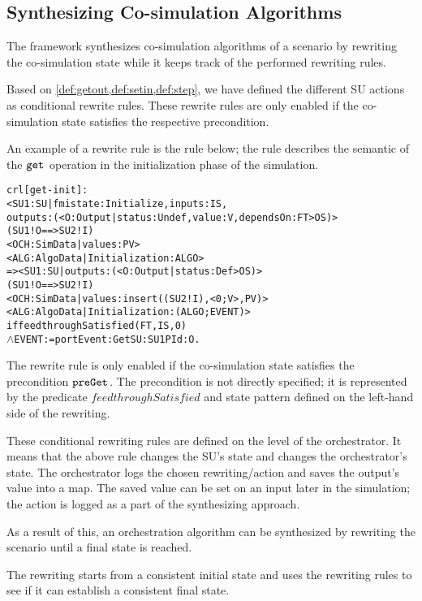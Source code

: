 \subsection{Synthesizing Co-simulation Algorithms}
The framework synthesizes co-simulation algorithms of a scenario by rewriting the co-simulation state while it keeps track of the performed rewriting rules.

Based on \cref{def:getout,def:setin,def:step}, we have defined the different SU actions as conditional rewrite rules.
These rewrite rules are only enabled if the co-simulation state satisfies the respective precondition.

An example of a rewrite rule is the rule below; the rule describes the semantic of the $\mathtt{get}_{}$ operation in the initialization phase of the simulation.

\begin{alltt}
  \small
  crl [get-init] :
  < SU1 : SU | fmistate : Initialize, inputs : IS, 
    outputs : (< O : Output | status : Undef, value : V, dependsOn : FT > OS) > 
  (SU1 ! O ==> SU2 ! I)
  < OCH : SimData | values : PV > 
  < ALG : AlgoData | Initialization : ALGO >
  => < SU1 : SU | outputs : (< O : Output | status : Def > OS) > 
    (SU1 ! O ==> SU2 ! I)
    < OCH : SimData | values : insert((SU2 ! I), < 0 ; V >, PV) >  
    < ALG : AlgoData | Initialization : (ALGO ; EVENT) >
if feedthroughSatisfied(FT, IS, 0)
  \(\land\) EVENT := portEvent: Get SU: SU1 PId: O . 
\end{alltt}

The rewrite rule is only enabled if the co-simulation state satisfies the precondition $\mathtt{preGet}_{}$.
The precondition is not directly specified; it is represented by the predicate $\mathit{feedthroughSatisfied}$ and state pattern defined on the left-hand side of the rewriting.

These conditional rewriting rules are defined on the level of the orchestrator.
It means that the above rule changes the SU's state and changes the orchestrator's state.
The orchestrator logs the chosen rewriting/action and saves the output's value into a map.
The saved value can be set on an input later in the simulation; the action is logged as a part of the synthesizing approach. 

As a result of this, an orchestration algorithm can be synthesized by rewriting the scenario until a final state is reached. 

The rewriting starts from a consistent initial state and uses the rewriting rules to see if it can establish a consistent final state.

